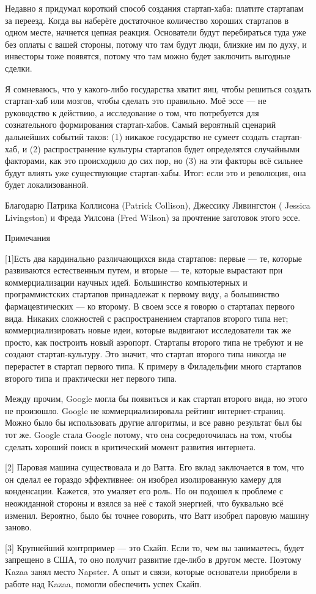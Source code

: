 \documentclass[ebook,12pt,oneside,openany]{memoir}
\begin{document}
Недавно я придумал короткий способ создания стартап-хаба: платите
стартапам за переезд. Когда вы наберёте достаточное количество хороших
стартапов в одном месте, начнется цепная реакция. Основатели будут
перебираться туда уже без оплаты с вашей стороны, потому что там будут
люди, близкие им по духу, и инвесторы тоже появятся, потому что там
можно будет заключить выгодные сделки.

Я сомневаюсь, что у какого-либо государства хватит яиц, чтобы решиться
создать стартап-хаб или мозгов, чтобы сделать это правильно. Моё эссе
— не руководство к действию, а исследование о том, что потребуется для
сознательного формирования стартап-хабов. Самый вероятный сценарий
дальнейших событий таков: (1) никакое государство не сумеет создать
стартап-хаб, и (2) распространение культуры стартапов будет
определятся случайными факторами, как это происходило до сих пор, но
(3) на эти факторы всё сильнее будут влиять уже существующие
стартап-хабы. Итог: если это и революция, она будет локализованной.

Благодарю Патрика Коллисона (Patrick Collison), Джессику Ливингстон (
Jessica Livingston) и Фреда Уилсона (Fred Wilson) за прочтение
заготовок этого эссе.

Примечания

[1]Есть два кардинально различающихся вида стартапов: первые — те,
которые развиваются естественным путем, и вторые — те, которые
вырастают при коммерциализации научных идей. Большинство компьютерных
и программистских стартапов принадлежат к первому виду, а большинство
фармацевтических — ко второму. В своем эссе я говорю о стартапах
первого вида. Никаких сложностей с распространением стартапов второго
типа нет; коммерциализировать новые идеи, которые выдвигают
исследователи так же просто, как построить новый аэропорт. Стартапы
второго типа не требуют и не создают стартап-культуру. Это значит, что
стартап второго типа никогда не перерастет в стартап первого типа. К
примеру в Филадельфии много стартапов второго типа и практически нет
первого типа.

Между прочим, Google могла бы появиться и как стартап второго вида, но
этого не произошло. Google не коммерциализировала рейтинг
интернет-страниц. Можно было бы использовать другие алгоритмы, и все
равно результат был бы тот же. Google стала Google потому, что она
сосредоточилась на том, чтобы сделать хороший поиск в критический
момент развития интернета.

[2] Паровая машина существовала и до Ватта. Его вклад заключается в
том, что он сделал ее гораздо эффективнее: он изобрел изолированную
камеру для конденсации. Кажется, это умаляет его роль. Но он подошел к
проблеме с неожиданной стороны и взялся за неё с такой энергией, что
буквально всё изменил. Вероятно, было бы точнее говорить, что Ватт
изобрел паровую машину заново.

[3] Крупнейший контрпример — это Скайп. Если то, чем вы занимаетесь,
будет запрещено в США, то оно получит развитие где-либо в другом
месте. Поэтому Kazaa занял место Napster. А опыт и связи, которые
основатели приобрели в работе над Kazaa, помогли обеспечить успех
Скайп.
\end{document}
